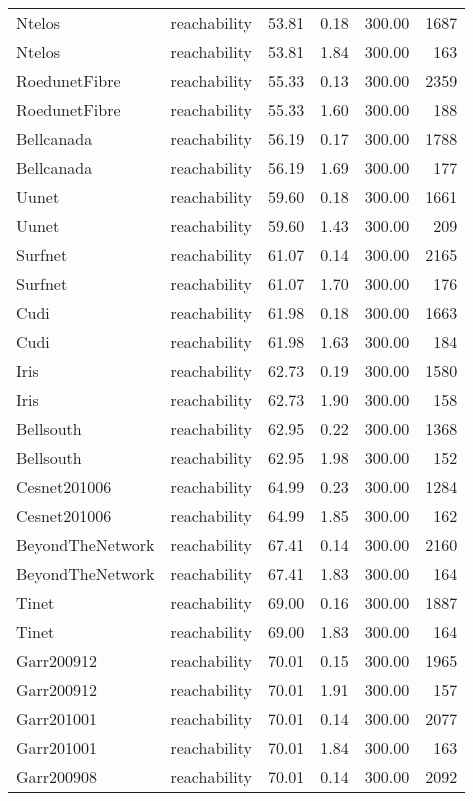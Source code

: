 \begin{tabular}{llrrrr}
Ntelos & reachability & 53.81 & 0.18 & 300.00 & 1687 \\
Ntelos & reachability & 53.81 & 1.84 & 300.00 & 163 \\
RoedunetFibre & reachability & 55.33 & 0.13 & 300.00 & 2359 \\
RoedunetFibre & reachability & 55.33 & 1.60 & 300.00 & 188 \\
Bellcanada & reachability & 56.19 & 0.17 & 300.00 & 1788 \\
Bellcanada & reachability & 56.19 & 1.69 & 300.00 & 177 \\
Uunet & reachability & 59.60 & 0.18 & 300.00 & 1661 \\
Uunet & reachability & 59.60 & 1.43 & 300.00 & 209 \\
Surfnet & reachability & 61.07 & 0.14 & 300.00 & 2165 \\
Surfnet & reachability & 61.07 & 1.70 & 300.00 & 176 \\
Cudi & reachability & 61.98 & 0.18 & 300.00 & 1663 \\
Cudi & reachability & 61.98 & 1.63 & 300.00 & 184 \\
Iris & reachability & 62.73 & 0.19 & 300.00 & 1580 \\
Iris & reachability & 62.73 & 1.90 & 300.00 & 158 \\
Bellsouth & reachability & 62.95 & 0.22 & 300.00 & 1368 \\
Bellsouth & reachability & 62.95 & 1.98 & 300.00 & 152 \\
Cesnet201006 & reachability & 64.99 & 0.23 & 300.00 & 1284 \\
Cesnet201006 & reachability & 64.99 & 1.85 & 300.00 & 162 \\
BeyondTheNetwork & reachability & 67.41 & 0.14 & 300.00 & 2160 \\
BeyondTheNetwork & reachability & 67.41 & 1.83 & 300.00 & 164 \\
Tinet & reachability & 69.00 & 0.16 & 300.00 & 1887 \\
Tinet & reachability & 69.00 & 1.83 & 300.00 & 164 \\
Garr200912 & reachability & 70.01 & 0.15 & 300.00 & 1965 \\
Garr200912 & reachability & 70.01 & 1.91 & 300.00 & 157 \\
Garr201001 & reachability & 70.01 & 0.14 & 300.00 & 2077 \\
Garr201001 & reachability & 70.01 & 1.84 & 300.00 & 163 \\
Garr200908 & reachability & 70.01 & 0.14 & 300.00 & 2092 \\

\end{tabular}
